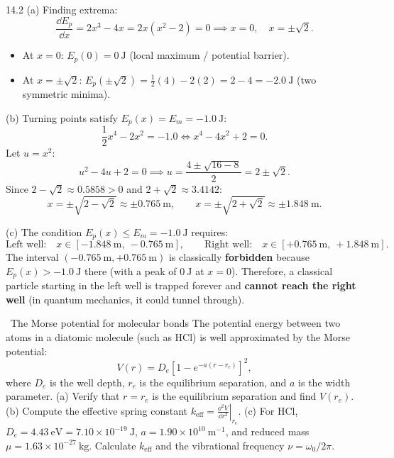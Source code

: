 \begin{solution}{14.2}
(a) Finding extrema:
\[
\frac{\dd E_p}{\dd x} = 2x^3 - 4x = 2x(x^2 - 2) = 0 \implies x = 0,\quad x = \pm\sqrt{2}.
\]
\begin{itemize}[leftmargin=1.4em,itemsep=2pt]
  \item At $x = 0$: $E_p(0) = 0\ \mathrm{J}$ (local maximum / potential barrier).
  \item At $x = \pm\sqrt{2}$: $E_p(\pm\sqrt{2}) = \frac{1}{2}(4) - 2(2) = 2 - 4 = -2.0\ \mathrm{J}$ (two symmetric minima).
\end{itemize}

(b) Turning points satisfy $E_p(x) = E_m = -1.0\ \mathrm{J}$:
\[
\frac{1}{2}x^4 - 2x^2 = -1.0 \iff x^4 - 4x^2 + 2 = 0.
\]
Let $u = x^2$:
\[
u^2 - 4u + 2 = 0 \implies u = \frac{4 \pm \sqrt{16 - 8}}{2} = 2 \pm \sqrt{2}.
\]
Since $2 - \sqrt{2} \approx 0.5858 > 0$ and $2 + \sqrt{2} \approx 3.4142$:
\[
x = \pm\sqrt{2 - \sqrt{2}} \approx \pm 0.765\ \mathrm{m},\qquad x = \pm\sqrt{2 + \sqrt{2}} \approx \pm 1.848\ \mathrm{m}.
\]

(c) The condition $E_p(x) \le E_m = -1.0\ \mathrm{J}$ requires:
\[
\text{Left well:}\quad x \in [-1.848\ \mathrm{m},\ -0.765\ \mathrm{m}], \qquad \text{Right well:}\quad x \in [+0.765\ \mathrm{m},\ +1.848\ \mathrm{m}].
\]
The interval $(-0.765\ \mathrm{m}, +0.765\ \mathrm{m})$ is classically \textbf{forbidden} because $E_p(x) > -1.0\ \mathrm{J}$ there (with a peak of $0\ \mathrm{J}$ at $x=0$).
Therefore, a classical particle starting in the left well is trapped forever and \textbf{cannot reach the right well} (in quantum mechanics, it could tunnel through).
\end{solution}

\begin{exercise}{\core\ The Morse potential for molecular bonds}
The potential energy between two atoms in a diatomic molecule (such as $\mathrm{HCl}$) is well approximated by the Morse potential:
\[
V(r) = D_e\left[ 1 - e^{-a(r - r_e)} \right]^2,
\]
where $D_e$ is the well depth, $r_e$ is the equilibrium separation, and $a$ is the width parameter.
(a) Verify that $r = r_e$ is the equilibrium separation and find $V(r_e)$.
(b) Compute the effective spring constant $k_{\text{eff}} = \left.\frac{\dd^2 V}{\dd r^2}\right|_{r_e}$.
(c) For $\mathrm{HCl}$, $D_e = 4.43\ \mathrm{eV} = 7.10\times 10^{-19}\ \mathrm{J}$, $a = 1.90\times 10^{10}\ \mathrm{m^{-1}}$, and reduced mass $\mu = 1.63\times 10^{-27}\ \mathrm{kg}$. Calculate $k_{\text{eff}}$ and the vibrational frequency $\nu = \omega_0 / 2\pi$.
\end{exercise}

